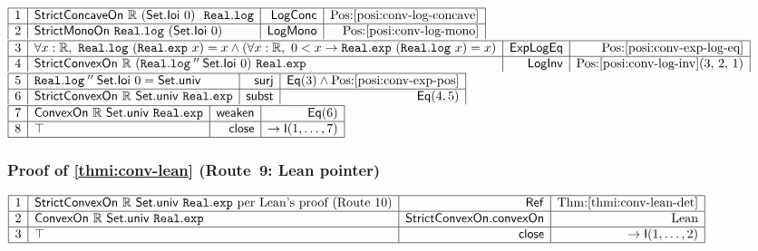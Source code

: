 \documentclass[11pt,reqno]{amsart}
\theoremstyle{redplain}
\numberwithin{equation}{section}
\begin{document}
\begin{center}
$%
\begin{array}{|c|l|r|r|}
\hline
1 & \mathsf{StrictConcaveOn}\ \mathbb{R}\ (\mathsf{Set.Ioi}\ 0)\ \mathtt{\
Real.log} & \mathsf{LogConc} & \mbox{Pos:\ref{posi:conv-log-concave}} \\ 
\hline
2 & \mathsf{StrictMonoOn}\ \mathtt{Real.log}\ (\mathsf{Set.Ioi}\ 0) & 
\mathsf{LogMono} & \mbox{Pos:\ref{posi:conv-log-mono}}%
\end{array}
$ \noindent $%
\begin{array}{|c|l|r|r|}
\hline
3 & \forall x:\mathbb{R},\ \mathtt{Real.log}\ (\mathtt{Real.exp}\ x)=x\wedge
(\forall x:\mathbb{R},\ 0<x\rightarrow \mathtt{Real.exp}\ (\mathtt{Real.log}
\ x)=x) & \mathsf{ExpLogEq} & \mbox{Pos:\ref{posi:conv-exp-log-eq}} \\ \hline
4 & \mathsf{StrictConvexOn}\ \mathbb{R}\ (\mathtt{Real.log}\mathbin{''}%
\mathsf{Set.Ioi}\ 0)\ \mathtt{Real.exp} & \mathsf{LogInv} & %
\mbox{Pos:\ref{posi:conv-log-inv}(3, 2, 1)} \\ 
\end{array}
$ \noindent $%
\begin{array}{|c|l|r|r|}
\hline
5 & \mathtt{Real.log}\mathbin{''}\mathsf{Set.Ioi}\ 0 = \mathsf{Set.univ} & 
\mathsf{surj} & \mathsf{Eq}(3)\wedge \mbox{Pos:\ref{posi:conv-exp-pos}} \\ 
\hline
6 & \mathsf{StrictConvexOn}\ \mathbb{R}\ \mathsf{Set.univ}\ \mathtt{Real.exp}
& \mathsf{subst} & \mathsf{Eq}(4,5) \\
\end{array}
$ \noindent $%
\begin{array}{|c|l|r|r|}
\hline
7 & \mathsf{ConvexOn}\ \mathbb{R}\ \mathsf{Set.univ}\ \mathtt{Real.exp} & 
\mathsf{weaken} & \mathsf{Eq}(6) \\ \hline
8 & \top & \mathsf{close} & \rightarrow \mathsf{I}(1,\dots ,7) \\ \hline
\end{array}
$
\end{center}

\subsubsection*{Proof of \autoref{thmi:conv-lean} (Route~9: Lean pointer)}

\begin{center}
$%
\begin{array}{|c|l|r|r|}
\hline
1 & \mathsf{StrictConvexOn}\ \mathbb{R}\ \mathsf{Set.univ}\ \mathtt{Real.exp}
\ \text{per Lean's proof (Route~10)} & \mathsf{Ref} & \mbox{Thm:%
\ref{thmi:conv-lean-det}} \\ \hline
2 & \mathsf{ConvexOn}\ \mathbb{R}\ \mathsf{Set.univ}\ \mathtt{Real.exp} & 
\mathsf{StrictConvexOn}.\allowbreak\mathsf{convexOn} & \text{Lean} \\ \hline
3 & \top & \mathsf{close} & \rightarrow \mathsf{I}(1,\dots ,2) \\ \hline
\end{array}
$
\end{center}
\end{document}
